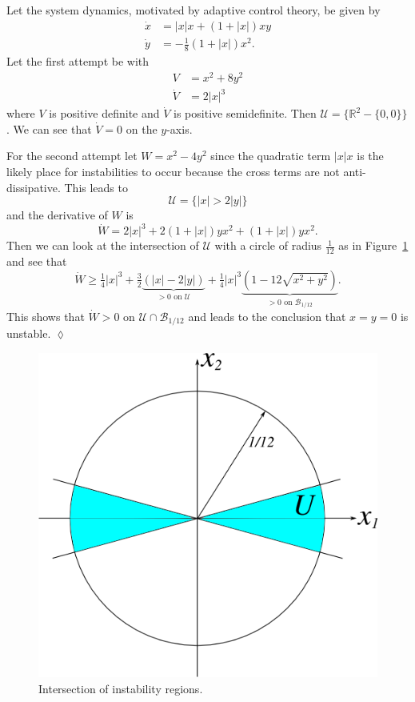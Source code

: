 \begin{example}
Let the system dynamics, motivated by adaptive control theory, be given by
\begin{align*}
\dot{x} &= |x|x + (1+|x|)xy \\
\dot{y} &= -\tfrac{1}{8}(1+|x|)x^2.
\end{align*}
Let the first attempt be with
\begin{align*}
V &= x^2 + 8y^2 \\
\dot{V} &= 2|x|^3
\end{align*}
where $V$ is positive definite and $\dot{V}$ is positive semidefinite.
Then $\mathcal{U} = \{\mathbb{R}^2 - \{0,0\}\}$.
We can see that $\dot{V} = 0$ on the $y$-axis.

For the second attempt let $W=x^2-4y^2$ since the quadratic term $|x|x$ is the likely place for instabilities to occur because the cross terms are not anti-dissipative.
This leads to
$$\mathcal{U} = \{|x|>2|y|\}$$
and the derivative of $W$ is
$$\dot{W} = 2|x|^3 + 2(1+|x|)yx^2 + (1+|x|)yx^2.$$
Then we can look at the intersection of $\mathcal{U}$ with a circle of radius $\tfrac{1}{12}$ as in Figure~\ref{fig:10unstableW} and see that
$$\dot{W} \geq \tfrac{1}{4}|x|^3 + \tfrac{3}{2}\underbrace{(|x|-2|y|)}_{>0\text{\ on\ }\mathcal{U}} + \tfrac{1}{4}|x|^3
  \underbrace{(1-12\sqrt{x^2+y^2})}_{>0\text{\ on\ }\mathcal{B}_{1/12}}.$$
This shows that $\dot{W}>0$ on $\mathcal{U}\cap\mathcal{B}_{1/12}$ and leads to the conclusion that $x=y=0$ is unstable.
$\lozenge$
\end{example}

\begin{figure}[ht!]
\centering
\includegraphics[width=.4\textwidth]{images/10unstableW}
\caption{Intersection of instability regions.}
\label{fig:10unstableW}
\end{figure}

